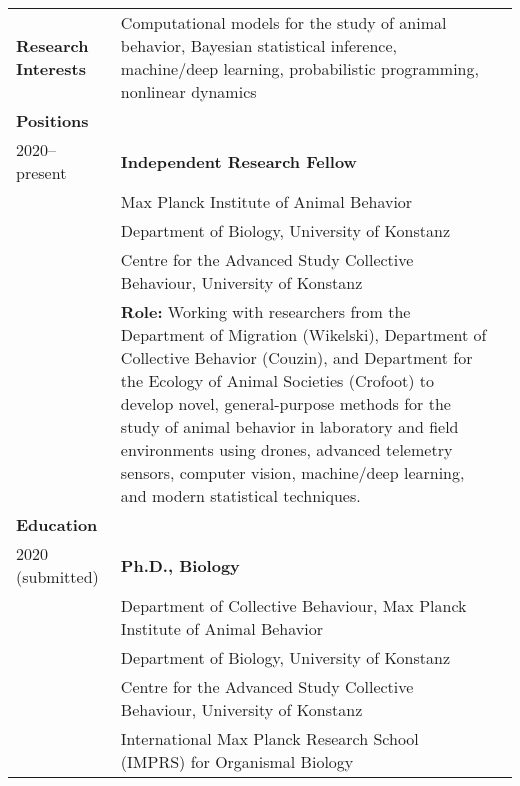 \documentclass[letterpaper,6pt,oneside]{article}
\begin{document}
\begin{small}
\noindent \begin{longtable}{@{} l p{5.3in}l}

\large{\textbf{Research Interests}}
& Computational models for the study of animal behavior, Bayesian statistical inference, machine/deep learning, probabilistic programming, nonlinear dynamics \vspace{2mm}\\ 

\Large{\textbf{Positions}} \vspace{5mm} \\
\large{2020--present} 
& \textbf{Independent Research Fellow} \\
& {Max Planck Institute of Animal Behavior} \\
& {Department of Biology, University of Konstanz} \\
& {Centre for the Advanced Study Collective Behaviour, University of Konstanz} \vspace{0.5mm} \\
& \textbf{Role:} Working with researchers from the Department of Migration (Wikelski), Department of Collective Behavior (Couzin), and Department for the Ecology of Animal Societies (Crofoot) to develop novel, general-purpose methods for the study of animal behavior in laboratory and field environments using drones, advanced telemetry sensors, computer vision, machine/deep learning, and modern statistical techniques. \\

\Large{\textbf{Education}} \vspace{5mm} \\
 \large{2020 (submitted)} 
 & \textbf{Ph.D., Biology} \\
 & {Department of Collective Behaviour, Max Planck Institute of Animal Behavior} \\
  & {Department of Biology, University of Konstanz} \\
    & {Centre for the Advanced Study Collective Behaviour, University of Konstanz} \\
 	& {International Max Planck Research School (IMPRS) for Organismal Biology} \\
     

\end{longtable}
\end{small}
\end{document}
